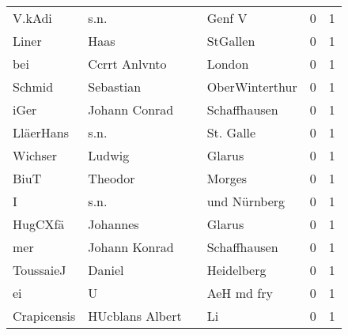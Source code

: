 \documentclass[10pt,a4paper,landscape]{article}
\begin{document}
\begin{longtable}{llllrr}
                   V.kAdi &                               s.n. &             &                                      Genf V &          0 &         1 \\
                    Liner &                               Haas &             &                                    StGallen &          0 &         1 \\
                      bei &                      Ccrrt Anlvnto &             &                                      London &          0 &         1 \\
                   Schmid &                          Sebastian &             &                              OberWinterthur &          0 &         1 \\
                     iGer &                      Johann Conrad &             &                                Schaffhausen &          0 &         1 \\
                LläerHans &                               s.n. &             &                                   St. Galle &          0 &         1 \\
                  Wichser &                             Ludwig &             &                                      Glarus &          0 &         1 \\
                     BiuT &                            Theodor &             &                                      Morges &          0 &         1 \\
                        I &                               s.n. &             &                                und Nürnberg &          0 &         1 \\
                  HugCXfä &                           Johannes &             &                                      Glarus &          0 &         1 \\
                      mer &                      Johann Konrad &             &                                Schaffhausen &          0 &         1 \\
                ToussaieJ &                             Daniel &             &                                  Heidelberg &          0 &         1 \\
                       ei &                                  U &             &                                  AeH md fry &          0 &         1 \\
              Crapicensis &                    HUcblans Albert &             &                                          Li &          0 &         1 \\

\end{longtable}
\end{document}
